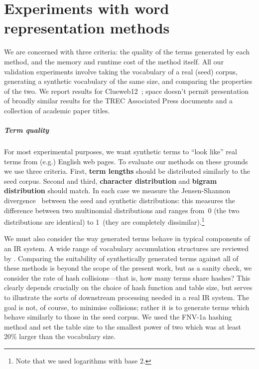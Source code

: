 \documentclass[11pt]{report}
\begin{document}
\chapter{Experiments with word representation methods}   %
\label{chap:wordRepExpts}
We are concerned with three criteria: the quality of the terms
generated by each method, and the memory and runtime cost of the method
itself.  All our validation experiments involve taking the vocabulary
of a real (seed) corpus, generating a synthetic vocabulary of the same size,
and comparing the properties of the two.  We report results for
Clueweb12~\cite{clueweb12}; space doesn't permit presentation of
broadly similar results for the TREC Associated Press documents 
and a collection of 
academic paper titles.

\paragraph*{Term quality}

For most experimental purposes, we want synthetic terms to ``look
like'' real terms from (e.g.) English web pages. To evaluate our
methods on these grounds we use three criteria. First, \textbf{term
  lengths} should be distributed similarly to the seed corpus. Second
and third, \textbf{character distribution} and \textbf{bigram
  distribution} should match. In each case we measure the
Jensen-Shannon divergence~\cite{Lin1991} between the seed and synthetic
distributions: this measures the difference between two multinomial
distributions and ranges from~0 (the two distributions are identical)
to 1~(they are completely dissimilar).\footnote{Note that we used
  logarithms with base 2.} 

We must also consider the way generated terms behave in typical
components of an IR system.  A wide range of vocabulary accumulation
structures are reviewed by \citet{HeinzZW2002}.  Comparing
the suitability of synthetically generated terms against all of these
methods is beyond the scope of the present work, but as a sanity
check, we consider the rate of hash collisions---that is, how many
terms share hashes? This clearly depends crucially on the choice of
hash function and table size, but serves to illustrate the sorts of
downstream processing needed in a real IR system. The goal is not, of
course, to minimise collisions; rather it is to generate terms which
behave similarly to those in the seed corpus.  We used the FNV-1a %
hashing method and set the table
size to the smallest power of two which was at least 20\% larger than
the vocabulary size.
\end{document}
